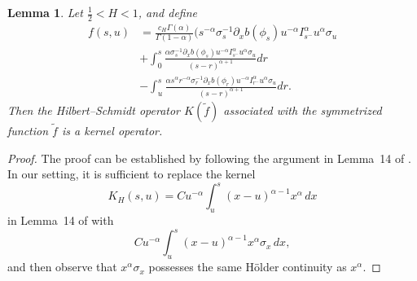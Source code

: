 \documentclass[preprint,12pt]{elsarticle}
\newtheorem{lemma}[theorem]{Lemma}
\theoremstyle{definition}  %
\theoremstyle{plain}  %
\begin{document}
\begin{lemma}
   Let $\tfrac{1}{2} < H < 1$, and define
   \begin{align*}
         f(s,u)&=\frac{c_H\Gamma(\alpha)}{\Gamma(1-\alpha)}	
	(
	 		s^{-\alpha}\sigma_s^{-1}\partial_x b(\phi_s)u^{-\alpha}I_{s^-}^\alpha u^\alpha  \sigma_u  \\
	 		&+\int_0^s \frac{\alpha \sigma_s^{-1}\partial_x b(\phi_s)u^{-\alpha}I_{s^-}^\alpha u^\alpha 
		\sigma_u}{(s-r)^{\alpha+1}}dr\\
		& -\int_u^s  \frac{\alpha s^\alpha r^{-\alpha} \sigma_r^{-1}\partial_x b(\phi_r) u^{-\alpha}I_{r^-}^\alpha u^\alpha  \sigma_u }{(s-r)^{\alpha+1}}dr .
   \end{align*}
    Then the Hilbert–Schmidt operator $K(\tilde{f})$ associated with the symmetrized function $\tilde{f}$ is a kernel operator.
  
\end{lemma}
\begin{proof}
    The proof can be established by following the argument in Lemma~14 of \cite{Nualart} . 
In our setting, it is sufficient to replace the kernel 
\[
K_H(s,u) = C u^{-\alpha} \int_u^s (x-u)^{\alpha-1} x^\alpha \, dx
\]
in Lemma~14 of  \cite{Nualart} with
\[
C u^{-\alpha} \int_u^s (x-u)^{\alpha-1} x^\alpha \sigma_x \, dx,
\]
and then observe that \(x^\alpha \sigma_x\) possesses the same H\"older continuity as \(x^\alpha\).

\end{proof}



















 
 
\end{document}
